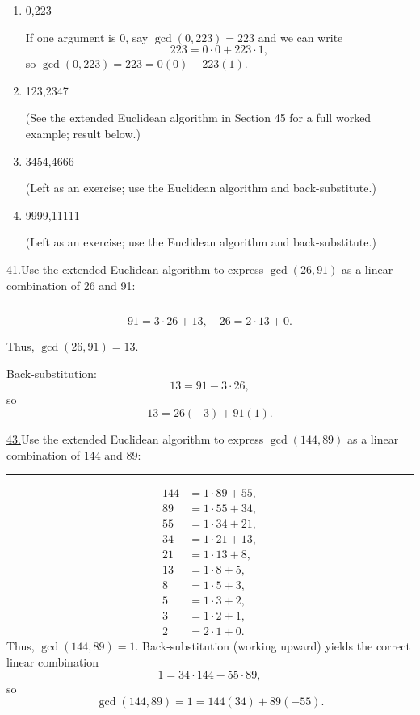 \documentclass[12pt]{article}
\begin{document}
\begin{enumerate} [label=(\alph*)]
Back-substitution yields
\[
3 = 117(-20) + 213(11).
\]

    \item 0,223

If one argument is 0, say $\gcd(0,223)=223$ and we can write
\[
223 = 0\cdot 0 + 223\cdot 1,
\]
so $\gcd(0,223) = 223 = 0(0) + 223(1)$.

    \item 123,2347

(See the extended Euclidean algorithm in Section 45 for a full worked example; result below.)

    \item 3454,4666

(Left as an exercise; use the Euclidean algorithm and back-substitute.)

    \item 9999,11111

(Left as an exercise; use the Euclidean algorithm and back-substitute.)
\end{enumerate}

\vspace{5mm}
\noindent\underline{41.}Use the extended Euclidean algorithm to express $\gcd(26,91)$ as a linear combination of 26 and 91:
\\ \rule{\linewidth}{0.5pt}
\[
91 = 3 \cdot 26 + 13,\quad 26 = 2 \cdot 13 + 0.
\]

Thus, $\gcd(26,91) = 13$.

Back-substitution:
\[
13 = 91 - 3\cdot 26,
\]
so
\[
13 = 26(-3) + 91(1).
\]

\vspace{5mm}
\noindent\underline{43.}Use the extended Euclidean algorithm to express $\gcd(144,89)$ as a linear combination of 144 and 89:
\\ \rule{\linewidth}{0.5pt}
\[
\begin{aligned}
144 &= 1\cdot89 + 55, \\
89  &= 1\cdot55 + 34, \\
55  &= 1\cdot34 + 21, \\
34  &= 1\cdot21 + 13, \\
21  &= 1\cdot13 + 8, \\
13  &= 1\cdot8 + 5, \\
8   &= 1\cdot5 + 3, \\
5   &= 1\cdot3 + 2, \\
3   &= 1\cdot2 + 1, \\
2   &= 2\cdot1 + 0.
\end{aligned}
\]
Thus, $\gcd(144,89) = 1$.
Back-substitution (working upward) yields the correct linear combination
\[
1 = 34\cdot144 - 55\cdot89,
\]
so
\[
\gcd(144,89) = 1 = 144(34) + 89(-55).
\]
\end{document}
